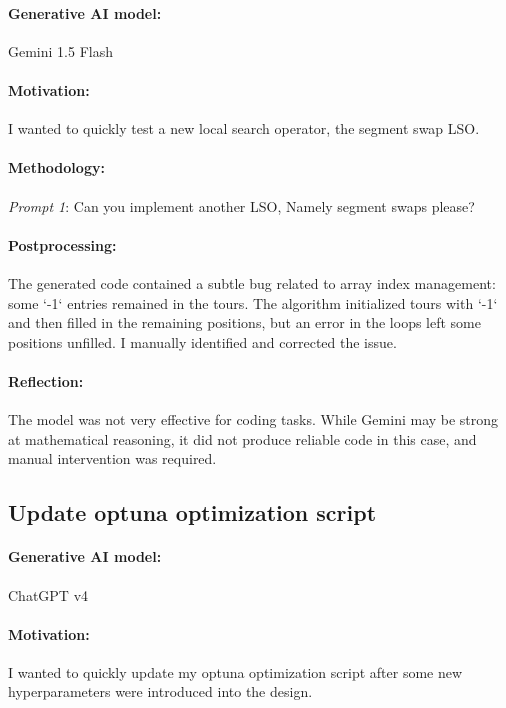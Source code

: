 \documentclass[a4paper,10pt]{article} %
\begin{document}
\paragraph{Generative AI model:} Gemini 1.5 Flash

\paragraph{Motivation:} 
I wanted to quickly test a new local search operator, the segment swap LSO.

\paragraph{Methodology:} 
\textit{Prompt 1}:
 Can you implement another LSO,
Namely segment swaps please? 

\paragraph{Postprocessing:} 
The generated code contained a subtle bug related to array index management: some `-1` entries remained in the tours. The algorithm initialized tours with `-1` and then filled in the remaining positions, but an error in the loops left some positions unfilled. I manually identified and corrected the issue.

\paragraph{Reflection:} 
The model was not very effective for coding tasks. While Gemini may be strong at mathematical reasoning, it did not produce reliable code in this case, and manual intervention was required.


\subsection{Update optuna optimization script} 
\paragraph{Generative AI model:} ChatGPT v4

\paragraph{Motivation:} 
I wanted to quickly update my optuna optimization script after some new hyperparameters were introduced into the design.
\end{document}
